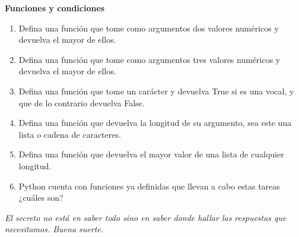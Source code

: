 \documentclass[12pt, oneside, a4paper, spanish]{article}
\begin{document}
\textbf{Funciones y condiciones}
\begin{enumerate}
	\item Defina una función que tome como argumentos dos valores numéricos y devuelva el mayor de ellos. 
	\item Defina una función que tome como argumentos tres valores numéricos y devuelva el mayor de ellos.
	\item Defina una función que tome un carácter y devuelva True si es una vocal, y que de lo contrario devuelva False.
	\item Defina una función que devuelva la longitud de su argumento, sea este una lista o cadena de caracteres.
	\item Defina una función que devuelva el mayor valor de una lista de cualquier longitud.
	\item Python cuenta con funciones ya definidas que llevan a cabo estas tareas ¿cuáles son?
\end{enumerate}

\begin{center}
	\textit{El secreto no está en saber todo sino en saber donde hallar las respuestas que necesitamos. Buena suerte.}
\end{center}
\end{document}
